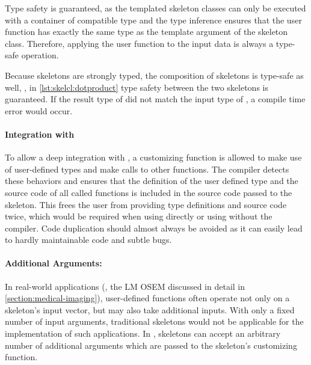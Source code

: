 Type safety is guaranteed, as the templated skeleton classes can only be executed with a container of compatible type and the type inference ensures that the user function has exactly the same type as the template argument of the skeleton class.
Therefore, applying the user function to the input data is always a type-safe operation.

Because skeletons are strongly typed, the composition of skeletons is type-safe as well, \ie, in \autoref{lst:skelcl:dotproduct} type safety between the two skeletons is guaranteed.
If the result type of  did not match the input type of , a compile time error would occur.

\paragraph{Integration with \Cpp}
To allow a deep integration with \Cpp, a customizing function is allowed to make use of user-defined types and make calls to other functions.
The  compiler detects these behaviors and ensures that the definition of the user defined type and the source code of all called functions is included in the source code passed to the skeleton.
This frees the user from providing type definitions and source code twice, which would be required when using \OpenCL directly or using \SkelCL without the  compiler.
Code duplication should almost always be avoided as it can easily lead to hardly maintainable code and subtle bugs.

\paragraph{Additional Arguments:}
In real-world applications (\eg, the LM OSEM discussed in detail in \autoref{section:medical-imaging}), user-defined functions often operate not only on a skeleton's input vector, but may also take additional inputs.
With only a fixed number of input arguments, traditional skeletons would not be applicable for the implementation of such applications.
In \SkelCL, skeletons can accept an arbitrary number of additional arguments which are passed to the skeleton's customizing function.


